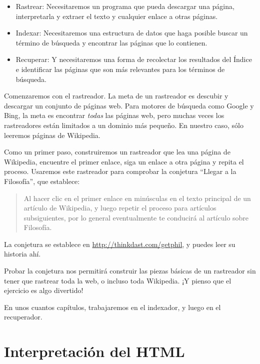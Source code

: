 \documentclass[12pt]{book}
\theoremstyle{exercise}
\begin{document}
\begin{itemize}

\item
  Rastrear: Necesitaremos un programa que pueda descargar una página, interpretarla
  y extraer el texto y cualquier enlace a otras páginas.

\item
  Indexar: Necesitaremos una estructura de datos que haga posible buscar un término
  de búsqueda y encontrar las páginas que lo contienen.

\item
  Recuperar: Y necesitaremos una forma de recolectar los resultados del Índice e identificar
  las páginas que son más relevantes para los términos de búsqueda.

\end{itemize}

Comenzaremos con el rastreador. La meta de un rastreador es descubir y
descargar un conjunto de páginas web. Para motores de búsqueda como Google
y Bing, la meta es encontrar \emph{todas} las páginas web, pero muchas veces los
rastreadores están limitados a un dominio más pequeño. En nuestro caso, sólo leeremos
páginas de Wikipedia.


Como un primer paso, construiremos un rastreador que lea una página de Wikipedia,
encuentre el primer enlace, siga un enlace a otra página y repita el proceso. Usaremos
este rastreador para comprobar la conjetura ``Llegar a la Filosofía'', que establece:

\begin{quote}
Al hacer clic en el primer enlace en minúsculas en el texto principal de un artículo de
Wikipedia, y luego repetir el proceso para artículos subsiguientes, por lo general
eventualmente te conducirá al artículo sobre Filosofía.
\end{quote}

La conjetura se establece en
\url{http://thinkdast.com/getphil}{},
y puedes leer su historia ahí.

Probar la conjetura nos permitirá construir las piezas básicas de un
rastreador sin tener que rastrear toda la web, o incluso toda
Wikipedia. ¡Y pienso que el ejercicio es algo divertido!

En unos cuantos capítulos, trabajaremos en el indexador, y luego en
el recuperador.

\section{Interpretación del HTML}
\label{parsing-html}
\end{document}
